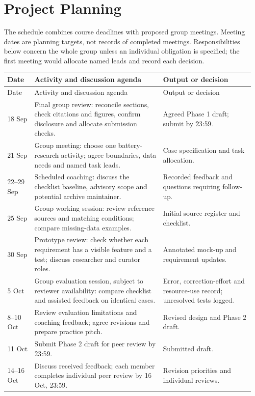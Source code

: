 \section{Project Planning}
The schedule combines course deadlines with proposed group meetings. Meeting dates are planning targets, not records of completed meetings. Responsibilities below concern the whole group unless an individual obligation is specified; the first meeting would allocate named leads and record each decision.

{\small
\begin{longtable}{@{}p{}p{}p{}@{}}
\toprule Date & Activity and discussion agenda & Output or decision \\
\midrule\endfirsthead
\toprule Date & Activity and discussion agenda & Output or decision \\
\midrule\endhead
18 Sep & Final group review: reconcile sections, check citations and figures, confirm disclosure and allocate submission checks. & Agreed Phase 1 draft; submit by 23:59. \\
\midrule
21 Sep & Group meeting: choose one battery-research activity; agree boundaries, data needs and named task leads. & Case specification and task allocation. \\
\midrule
22--29 Sep & Scheduled coaching: discuss the checklist baseline, advisory scope and potential archive maintainer. & Recorded feedback and questions requiring follow-up. \\
\midrule
25 Sep & Group working session: review reference sources and matching conditions; compare missing-data examples. & Initial source register and checklist. \\
\midrule
30 Sep & Prototype review: check whether each requirement has a visible feature and a test; discuss researcher and curator roles. & Annotated mock-up and requirement updates. \\
\midrule
5 Oct & Group evaluation session, subject to reviewer availability: compare checklist and assisted feedback on identical cases. & Error, correction-effort and resource-use record; unresolved tests logged. \\
\midrule
8--10 Oct & Review evaluation limitations and coaching feedback; agree revisions and prepare practice pitch. & Revised design and Phase 2 draft. \\
\midrule
11 Oct & Submit Phase 2 draft for peer review by 23:59. & Submitted draft. \\
\midrule
14--16 Oct & Discuss received feedback; each member completes individual peer review by 16 Oct, 23:59. & Revision priorities and individual reviews. \\

\end{longtable}}
